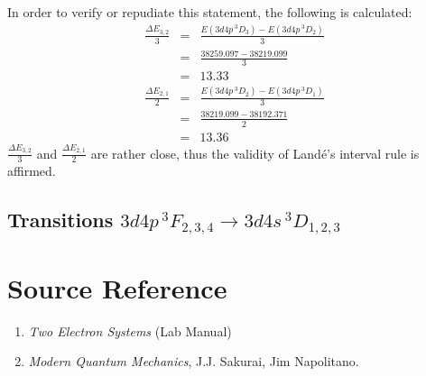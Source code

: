 \documentclass[a4paper]{article}
\begin{document}
In order to verify or repudiate this statement, the following is
calculated:
\begin{eqnarray*}
\frac{\Delta E_{3,2}}{3} &=& \frac{E(3d4p\,^3D_3) -
  E(3d4p\,^3D_2)}{3}\\
&=& \frac{38259.097 - 38219.099}{3} \\
&=& 13.33 \\
\frac{\Delta E_{2,1}}{2} &=& \frac{E(3d4p\,^3D_2) -
  E(3d4p\,^3D_1)}{3}\\
&=& \frac{38219.099 - 38192.371}{2} \\
&=& 13.36
\end{eqnarray*}
$\frac{\Delta E_{3,2}}{3}$ and $\frac{\Delta E_{2,1}}{2}$ are rather
close, thus the validity of Land\'e's interval rule is affirmed.

\subsection{Transitions $3d4p\,^3F_{2,3,4} \to 3d4s\,^3D_{1,2,3}$}

\section{Source Reference}

\begin{enumerate}
\item \textit{Two Electron Systems} (Lab Manual)
\item \textit{Modern Quantum Mechanics}, J.J. Sakurai, Jim Napolitano. 
\end{enumerate}
\end{document}
